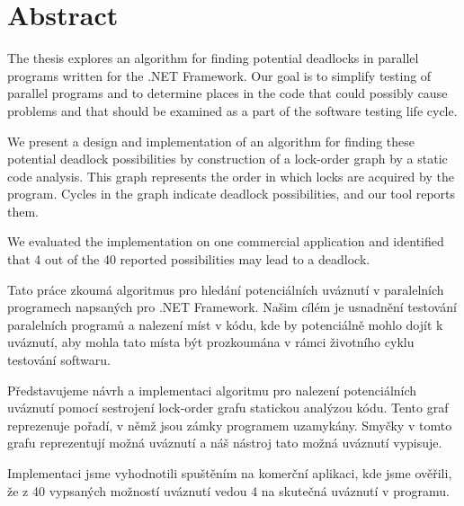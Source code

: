\cleardoublepage
\noindent
\chapter*{Abstract}

The thesis explores an algorithm for finding potential deadlocks in parallel programs written for the .NET Framework. Our goal is to simplify testing of parallel programs and to determine places in the code that could possibly cause problems and that should be examined as a part of the software testing life cycle.

We present a design and implementation of an algorithm for finding these potential deadlock possibilities by construction of a lock-order graph by a static code analysis. This graph represents the order in which locks are acquired by the program. Cycles in the graph indicate deadlock possibilities, and our tool reports them.

We evaluated the implementation on one commercial application and identified that 4 out of the 40 reported possibilities may lead to a deadlock. 


\begin{flushright}
{}
\baselineskip
\end{flushright}

{
\noindent
Tato práce zkoumá algoritmus pro hledání potenciálních uváznutí v paralelních programech napsaných pro .NET Framework. Našim cílém je usnadnění testování paralelních programů a nalezení míst v kódu, kde by potenciálně mohlo dojít k uváznutí, aby mohla tato místa být prozkoumána v rámci životního cyklu testování softwaru.

Představujeme návrh a implementaci algoritmu pro nalezení potenciálních uváznutí pomocí sestrojení lock-order grafu statickou analýzou kódu. Tento graf reprezenuje pořadí, v němž jsou zámky programem uzamykány. Smyčky v tomto grafu reprezentují možná uváznutí a náš nástroj tato možná uváznutí vypisuje.

Implementaci jsme vyhodnotili spuštěním na komerční aplikaci, kde jsme ověřili, že z 40 vypsaných možností uváznutí vedou 4 na skutečná uváznutí v programu.
}